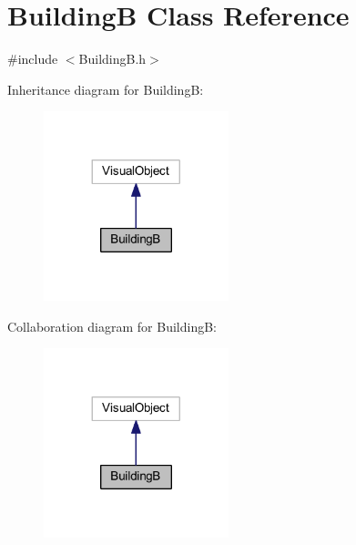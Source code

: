 \hypertarget{class_building_b}{}\section{BuildingB Class Reference}
\label{class_building_b}


{\ttfamily \#include $<$Building\+B.\+h$>$}



Inheritance diagram for BuildingB\+:\nopagebreak
\begin{figure}[H]
\begin{center}
\leavevmode
\includegraphics[width=152pt]{class_building_b__inherit__graph}
\end{center}
\end{figure}


Collaboration diagram for BuildingB\+:\nopagebreak
\begin{figure}[H]
\begin{center}
\leavevmode
\includegraphics[width=152pt]{class_building_b__coll__graph}
\end{center}
\end{figure}
